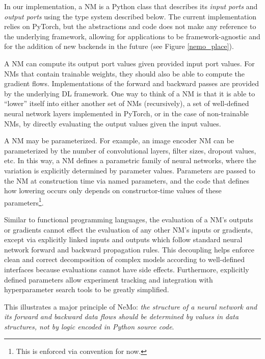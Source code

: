 \documentclass{article}
\begin{document}
In our implementation, a NM is a Python class that describes its \textit{input ports} and \textit{output ports} using the type system described below. The current implementation relies  on PyTorch, but the abstractions and code does not make any reference to the underlying framework, allowing for applications to be framework-agnostic and for the addition of new backends in the future (see Figure \ref{nemo_place}).

A NM can compute its output port values given provided input port values. For NMs that contain trainable weights, they should also be able to compute the gradient flows. Implementations of the forward and backward passes are provided by the underlying DL framework. One way to think of a NM is that it is able to ``lower'' itself into either another set of NMs (recursively), a set of well-defined neural network layers implemented in PyTorch, or in the case of non-trainable NMs, by directly evaluating the output values given the input values.  

A NM may be parameterized. For example, an image encoder NM can be parameterized by the number of convolutional layers, filter sizes, dropout values, etc. In this way, a NM defines a parametric family of neural networks, where the variation is explicitly determined by parameter values. Parameters are passed to the NM at construction time via named parameters, and the code that defines how lowering occurs only depends on constructor-time values of these parameters\footnote{This is enforced via convention for now.}.

Similar to functional programming languages, the evaluation of a NM's outputs or gradients cannot effect the evaluation of any other NM's inputs or gradients, except via explicitly linked inputs and outputs which follow standard neural network forward and backward propagation rules. This decoupling helps enforce clean and correct decomposition of complex models according to well-defined interfaces because evaluations cannot have side effects. Furthermore, explicitly defined parameters allow experiment tracking and integration with hyperparameter search tools to be greatly simplified. 

This illustrates a major principle of NeMo: \textit{the structure of a neural network and its forward and backward data flows should be determined by values in data structures, not by logic encoded in Python source code}. 
\end{document}
